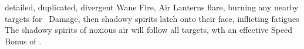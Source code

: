   {detailed, duplicated, divergent}%
  {Wane}%
  {Fire, Air}%
  {}%
  {Lanterns flare, burning  any nearby targets for \showDam\ Damage, then shadowy spirits latch onto their face, inflicting  \glspl{fatigue}}%
  {The shadowy spirits of noxious air will follow all targets, wth an effective Speed Bonus of .}
